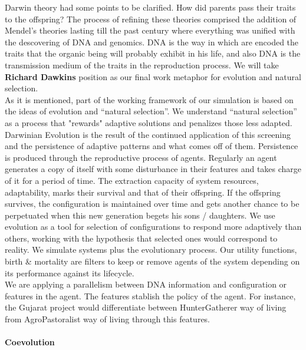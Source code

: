 \documentclass[11pt,oneside,a4paper,openright]{report}
\begin{document}
Darwin theory had some points to be clarified. How did parents pass their traits to the offspring?
The process of refining these theories comprised the addition of Mendel's theories lasting till 
the past century where everything was unified with the descovering of DNA and genomics. DNA is the 
way in which are encoded the traits that the organic being will probably exhibit in his life, and 
also DNA is the transmission medium of the traits in the reproduction process. We will take \textbf{Richard Dawkins} 
position as our final work metaphor for evolution and natural selection\cite{Dawkins1990}.\\ 
As it is mentioned, part of the working framework of our simulation is based on the ideas of evolution and ``natural selection''. We understand ``natural selection'' as a process that "rewards" adaptive solutions and penalizes those less adapted. Darwinian Evolution is the result of the continued application of this screening and the persistence of adaptive patterns and what comes off of them. Persistence is produced through the reproductive process of agents. Regularly an agent generates a copy of itself with some disturbance in their features and takes charge of it for a period of time. The extraction capacity of system resources, adaptability,  marks their survival and that of their offspring. If the offspring survives, the configuration is maintained over time and gets another chance to be perpetuated when this new generation begets his sons / daughters. We use evolution as a tool for selection of configurations to respond more adaptively than others, working with the hypothesis that selected ones would correspond to reality. We simulate systems plus the evolutionary process. Our utility functions, birth \& mortality are filters to keep or remove agents of the system depending on its performance against its lifecycle.\\ 
We are applying a parallelism between DNA information and configuration or features in the agent. The features stablish
the policy of the agent. For instance, the Gujarat project would differentiate between HunterGatherer way of living from AgroPastoralist way of living through this features.
\paragraph{Coevolution}
\end{document}
